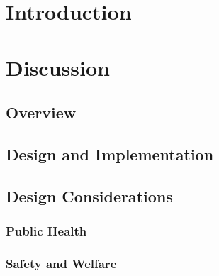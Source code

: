 \documentclass[12pt]{article}
\begin{document}
\section{Introduction}


\section{Discussion}


\subsection{Overview}


\subsection{Design and Implementation}


\subsection{Design Considerations}

\subsubsection{Public Health}

\subsubsection{Safety and Welfare}
\end{document}
